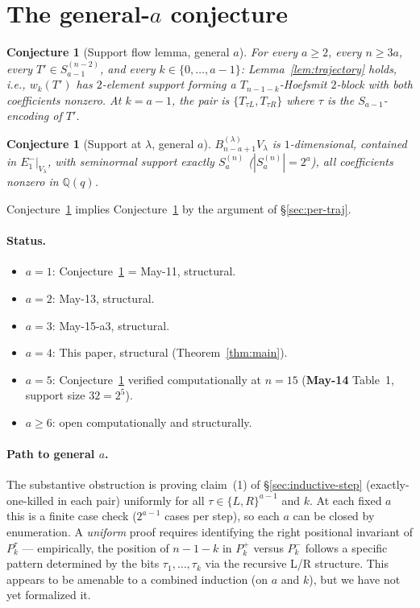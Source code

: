\documentclass[11pt]{article}
\newtheorem{conjecture}[theorem]{Conjecture}
\theoremstyle{definition}
\begin{document}
\section{The general-$a$ conjecture}\label{sec:general-a}

\begin{conjecture}[Support flow lemma, general $a$]\label{conj:flow}
For every $a\ge 2$, every $n\ge 3a$, every $T'\in S_{a-1}^{(n-2)}$,
and every $k\in\{0,\ldots,a-1\}$: Lemma~\ref{lem:trajectory} holds,
i.e., $w_k(T')$ has $2$-element support forming a $T_{n-1-k}$-Hoefsmit
$2$-block with both coefficients nonzero.  At $k=a-1$, the pair
is $\{T_{\tau L},T_{\tau R}\}$ where $\tau$ is the $S_{a-1}$-encoding
of $T'$.
\end{conjecture}

\begin{conjecture}[Support at $\lambda$, general $a$]\label{conj:Sa-support}
$B_{n-a+1}^{(\lambda)} V_\lambda$ is $1$-dimensional, contained in
$E_1^-|_{V_\lambda}$, with seminormal support exactly $S_a^{(n)}$
($|S_a^{(n)}|=2^a$), all coefficients nonzero in $\mathbb{Q}(q)$.
\end{conjecture}

Conjecture~\ref{conj:flow} implies Conjecture~\ref{conj:Sa-support}
by the argument of \S\ref{sec:per-traj}.

\paragraph{Status.}
\begin{itemize}[leftmargin=2em,topsep=0.3em,itemsep=0.2em]
\item $a=1$: Conjecture~\ref{conj:Sa-support} = May-11, structural.
\item $a=2$: May-13, structural.
\item $a=3$: May-15-a3, structural.
\item $a=4$: This paper, structural (Theorem~\ref{thm:main}).
\item $a=5$: Conjecture~\ref{conj:Sa-support} verified computationally
at $n=15$ (\textbf{May-14} Table~1, support size $32=2^5$).
\item $a\ge 6$: open computationally and structurally.
\end{itemize}

\paragraph{Path to general $a$.}  The substantive obstruction is
proving claim~(1) of \S\ref{sec:inductive-step} (exactly-one-killed in
each pair) uniformly for all $\tau\in\{L,R\}^{a-1}$ and $k$.  At each
fixed $a$ this is a finite case check ($2^{a-1}$ cases per step), so
each $a$ can be closed by enumeration.  A \emph{uniform} proof
requires identifying the right positional invariant of $P_k^\tau$ —
empirically, the position of $n-1-k$ in $P_k^+$ versus $P_k^-$
follows a specific pattern determined by the bits $\tau_1,\ldots,
\tau_k$ via the recursive L/R structure.  This appears to be
amenable to a combined induction (on $a$ and $k$), but we have not
yet formalized it.
\end{document}
